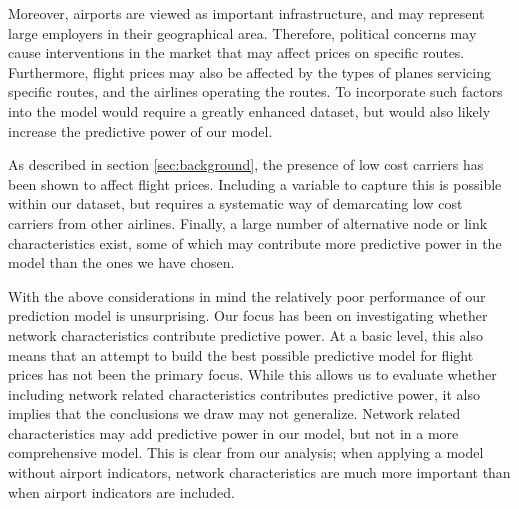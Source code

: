 Moreover, airports are viewed as important infrastructure, and may represent large employers in their geographical area. Therefore, political concerns may cause interventions in the market that may affect prices on specific routes. Furthermore, flight prices may also be affected by the types of planes servicing specific routes, and the airlines operating the routes. To incorporate such factors into the model would require a greatly enhanced dataset, but would also likely increase the predictive power of our model.

As described in section \ref{sec:background}, the presence of low cost carriers has been shown to affect flight prices. Including a variable to capture this is possible within our dataset, but requires a systematic way of demarcating low cost carriers from other airlines. 
Finally, a large number of alternative node or link characteristics exist, some of which may contribute more predictive power in the model than the ones we have chosen. 

With the above considerations in mind the relatively poor performance of our prediction model is unsurprising. Our focus has been on investigating whether network characteristics contribute predictive power. At a basic level, this also means that an attempt to build the best possible predictive model for flight prices has not been the primary focus. While this allows us to evaluate whether including network related characteristics contributes predictive power, it also implies that the conclusions we draw may not generalize. Network related characteristics may add predictive power in our model, but not in a more comprehensive model. This is clear from our analysis; when applying a model without airport indicators, network characteristics are much more important than when airport indicators are included. 
